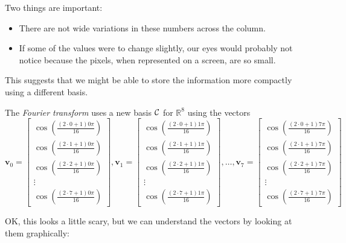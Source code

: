 \documentclass[12pt]{article}
\newcommand{\vvec}{{\mathbf v}}
\newcommand{\real}{{\mathbb R}}
\newcommand{\ccal}{{\cal C}}
\begin{document}
\begin{enumerate}
  Two things are important:
  \begin{itemize}
  \item There are not wide variations in these numbers across the
    column.
  \item If some of the values were to change slightly, our eyes would
    probably not notice because the pixels, when represented on a
    screen, are so small.
  \end{itemize}

  This suggests that we might be able to store the information more
  compactly using a different basis.

  The {\em Fourier transform} uses a new basis $\ccal$ for $\real^8$
  using the vectors
  $$
  \vvec_0 = \left[\begin{array}{c}
      \cos\left(\frac{(2\cdot 0+1)0\pi}{16}\right) \\
      \cos\left(\frac{(2\cdot 1+1)0\pi}{16}\right) \\
      \cos\left(\frac{(2\cdot 2+1)0\pi}{16}\right) \\
      \vdots \\
      \cos\left(\frac{(2\cdot 7+1)0\pi}{16}\right) 
      \end{array}\right], 
  \vvec_1 = \left[\begin{array}{c}
      \cos\left(\frac{(2\cdot 0+1)1\pi}{16}\right) \\
      \cos\left(\frac{(2\cdot 1+1)1\pi}{16}\right) \\
      \cos\left(\frac{(2\cdot 2+1)1\pi}{16}\right) \\
      \vdots \\
      \cos\left(\frac{(2\cdot 7+1)1\pi}{16}\right) 
      \end{array}\right], \ldots,
  \vvec_7 = \left[\begin{array}{c}
      \cos\left(\frac{(2\cdot 0+1)7\pi}{16}\right) \\
      \cos\left(\frac{(2\cdot 1+1)7\pi}{16}\right) \\
      \cos\left(\frac{(2\cdot 2+1)7\pi}{16}\right) \\
      \vdots\\
      \cos\left(\frac{(2\cdot 7+1)7\pi}{16}\right) 
      \end{array}\right]
    $$

    OK, this looks a little scary, but we can understand the vectors
    by looking at them graphically:


\end{enumerate}
\end{document}
